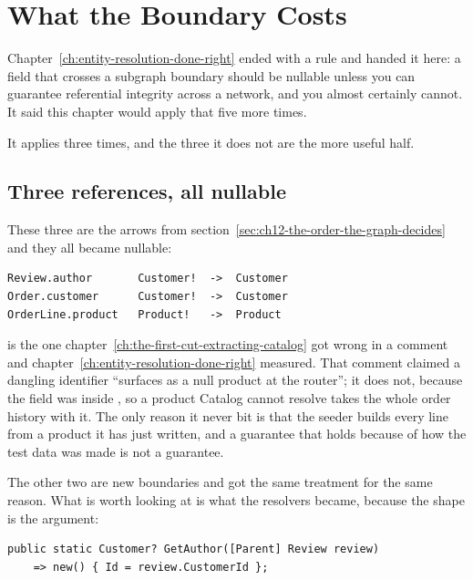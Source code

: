 \section{What the Boundary Costs}
\label{sec:ch12-what-the-boundary-costs}
%

Chapter~\ref{ch:entity-resolution-done-right} ended with a rule and handed it
here: a field that crosses a subgraph boundary should be nullable unless you can
guarantee referential integrity across a network, and you almost certainly
cannot. It said this chapter would apply that five more times.

It applies three times, and the three it does not are the more useful half.

\subsection*{Three references, all nullable}

%
These three are the arrows from section~\ref{sec:ch12-the-order-the-graph-decides}
and they all became nullable:

\begin{verbatim}
Review.author       Customer!  ->  Customer
Order.customer      Customer!  ->  Customer
OrderLine.product   Product!   ->  Product
\end{verbatim}

 is the one
chapter~\ref{ch:the-first-cut-extracting-catalog} got wrong in a comment and
chapter~\ref{ch:entity-resolution-done-right} measured. That comment claimed a
dangling identifier
\enquote{surfaces as a null product at the router}; it does not, because the
field was  inside , so a product
Catalog cannot resolve takes the whole order history with it. The only reason it
never bit is that the seeder builds every line from a product it has just
written, and a guarantee that holds because of how the test data was made is not
a guarantee.

The other two are new boundaries and got the same treatment for the same reason.
What is worth looking at is what the resolvers became, because the shape is the
argument:

\begin{verbatim}
public static Customer? GetAuthor([Parent] Review review)
    => new() { Id = review.CustomerId };
\end{verbatim}

